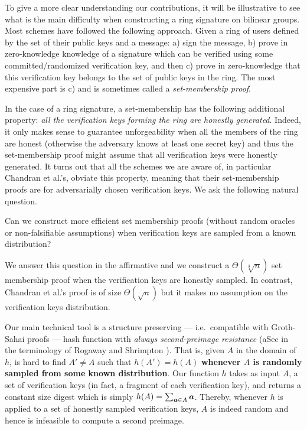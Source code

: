 
To give a more clear understanding our contributions, it will be illustrative to see what is the main difficulty when constructing a ring signature on bilinear groups. Most schemes have followed the following approach. Given a ring of users defined by the set of their public keys and a message: a) sign the message, b) prove in zero-knowledge knowledge of a signature which can be verified using some committed/randomized verification key, and then c) prove in zero-knowledge that this verification key belongs to the set of public keys in the ring.  The most expensive part is c) and is sometimes called a \emph{set-membership proof}.

In the case of a ring signature, a set-membership has the following additional property: \emph{all the verification keys forming the ring are honestly generated}. 
Indeed, it only makes sense to guarantee unforgeability when all the members of the ring are honest (otherwise the adversary knows at least one secret key) and thus the set-membership proof might assume that all verification keys were honestly generated.
It turns out that all the schemes we are aware of, in particular Chandran et al.'s, obviate this property, meaning that their set-membership proofs are for adversarially chosen verification keys.
We ask the following natural question.
\begin{displayquote}
Can we construct more efficient set membership proofs (without random oracles or non-falsifiable assumptions) when verification keys are sampled from a known distribution?
\end{displayquote}
We answer this question in the affirmative and we construct a $\Theta(\sqrt[3]{n})$ set membership proof when the verification keys are honestly sampled. In contrast, Chandran et al.'s proof is of size $\Theta(\sqrt{n})$ but it makes no assumption on the verification keys distribution.

Our main technical tool is a structure preserving --- i.e.~compatible with Groth-Sahai proofs --- hash function with \emph{always second-preimage resistance} (aSec in the terminology of Rogaway and Shrimpton \cite{FSE:RogShr04}). That is, given $A$ in the domain of $h$, is hard to find $A'\neq A$ such that $h(A')=h(A)$ {\bf whenever $A$ is randomly sampled from some known distribution}.
Our function $h$ takes as input $A$, a set of verification keys (in fact, a fragment of each verification key), and returns a constant size digest which is simply $h(A)= \sum_{{\boldsymbol{a}} \in A} {\boldsymbol{a}}$. Thereby, whenever $h$ is applied to a set of honestly sampled verification keys, $A$ is indeed random and hence is infeasible to compute a second preimage.

